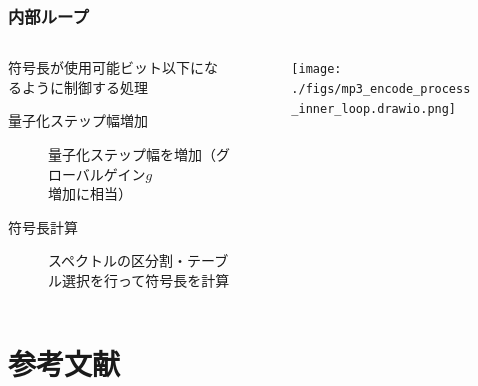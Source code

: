 \documentclass[14pt,xcolor=dvipsnames,table,dvipdfmx]{beamer}
\begin{document}
\begin{frame}[c]
    \frametitle{内部ループ}
    \begin{columns}
        \begin{column}{0.6\textwidth}
            符号長が使用可能ビット以下になるように制御する処理
            \begin{description}
                \item[量子化ステップ幅増加] 量子化ステップ幅を増加（グローバルゲイン$g$増加に相当）
                \item[符号長計算] スペクトルの区分割・テーブル選択を行って符号長を計算
            \end{description}
        \end{column}
        \begin{column}{0.4\textwidth}
            \begin{figure}
                \texttt{[image: ./figs/mp3\_encode\_process\_inner\_loop.drawio.png]}
            \end{figure}
        \end{column}
    \end{columns}
\end{frame}

\appendix

\section{参考文献}
\end{document}
